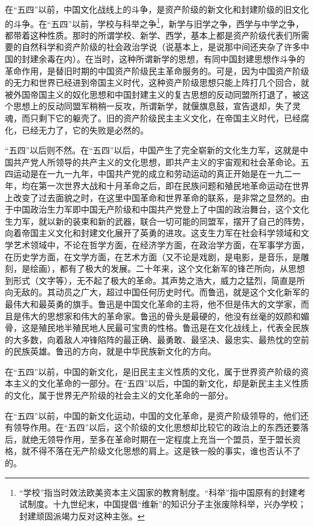 \documentclass[UTF8, 12pt, a4paper]{ctexrep}
\begin{document}
在“五四”以前，中国文化战线上的斗争，是资产阶级的新文化和封建阶级的旧文化的斗争。在“五四”以前，学校与科举之争\footnote{“学校”指当时效法欧美资本主义国家的教育制度。“科举”指中国原有的封建考试制度。十九世纪末，中国提倡“维新”的知识分子主张废除科举，兴办学校；封建顽固派竭力反对这种主张。}，新学与旧学之争，西学与中学之争，都带着这种性质。那时的所谓学校、新学、西学，基本上都是资产阶级代表们所需要的自然科学和资产阶级的社会政治学说（说基本上，是说那中间还夹杂了许多中国的封建余毒在内）。在当时，这种所谓新学的思想，有同中国封建思想作斗争的革命作用，是替旧时期的中国资产阶级民主革命服务的。可是，因为中国资产阶级的无力和世界已经进到帝国主义时代，这种资产阶级思想只能上阵打几个回合，就被外国帝国主义的奴化思想和中国封建主义的复古思想的反动同盟所打退了，被这个思想上的反动同盟军稍稍一反攻，所谓新学，就偃旗息鼓，宣告退却，失了灵魂，而只剩下它的躯壳了。旧的资产阶级民主主义文化，在帝国主义时代，已经腐化，已经无力了，它的失败是必然的。

“五四”以后则不然。在“五四”以后，中国产生了完全崭新的文化生力军，这就是中国共产党人所领导的共产主义的文化思想，即共产主义的宇宙观和社会革命论。五四运动是在一九一九年，中国共产党的成立和劳动运动的真正开始是在一九二一年，均在第一次世界大战和十月革命之后，即在民族问题和殖民地革命运动在世界上改变了过去面貌之时，在这里中国革命和世界革命的联系，是非常之显然的。由于中国政治生力军即中国无产阶级和中国共产党登上了中国的政治舞台，这个文化生力军，就以新的装束和新的武器，联合一切可能的同盟军，摆开了自己的阵势，向着帝国主义文化和封建文化展开了英勇的进攻。这支生力军在社会科学领域和文学艺术领域中，不论在哲学方面，在经济学方面，在政治学方面，在军事学方面，在历史学方面，在文学方面，在艺术方面（又不论是戏剧，是电影，是音乐，是雕刻，是绘画），都有了极大的发展。二十年来，这个文化新军的锋芒所向，从思想到形式（文字等），无不起了极大的革命。其声势之浩大，威力之猛烈，简直是所向无敌的。其动员之广大，超过中国任何历史时代。而鲁迅，就是这个文化新军的最伟大和最英勇的旗手。鲁迅是中国文化革命的主将，他不但是伟大的文学家，而且是伟大的思想家和伟大的革命家。鲁迅的骨头是最硬的，他没有丝毫的奴颜和媚骨，这是殖民地半殖民地人民最可宝贵的性格。鲁迅是在文化战线上，代表全民族的大多数，向着敌人冲锋陷阵的最正确、最勇敢、最坚决、最忠实、最热忱的空前的民族英雄。鲁迅的方向，就是中华民族新文化的方向。

在“五四”以前，中国的新文化，是旧民主主义性质的文化，属于世界资产阶级的资本主义的文化革命的一部分。在“五四”以后，中国的新文化，却是新民主主义性质的文化，属于世界无产阶级的社会主义的文化革命的一部分。

在“五四”以前，中国的新文化运动，中国的文化革命，是资产阶级领导的，他们还有领导作用。在“五四”以后，这个阶级的文化思想却比较它的政治上的东西还要落后，就绝无领导作用，至多在革命时期在一定程度上充当一个盟员，至于盟长资格，就不得不落在无产阶级文化思想的肩上。这是铁一般的事实，谁也否认不了的。
\end{document}
